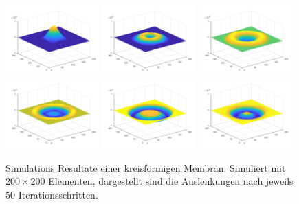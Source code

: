 \begin{figure}
\begin{center}
		\includegraphics[width=0.32\textwidth]{papers/kreismembran/images/sim_1_1.png}
		\includegraphics[width=0.32\textwidth]{papers/kreismembran/images/sim_1_2.png}
		\includegraphics[width=0.32\textwidth]{papers/kreismembran/images/sim_1_3.png}
		\includegraphics[width=0.32\textwidth]{papers/kreismembran/images/sim_1_4.png}
		\includegraphics[width=0.32\textwidth]{papers/kreismembran/images/sim_1_5.png}
		\includegraphics[width=0.32\textwidth]{papers/kreismembran/images/sim_1_6.png}
		\caption{Simulations Resultate einer kreisförmigen Membran. Simuliert mit $ 200 \times 200 $ Elementen, dargestellt sind die Auslenkungen nach jeweils $ 50 $ Iterationsschritten.}
		\label{kreismembran:im:simres_rund}
		
	\end{center}	
\end{figure} 
